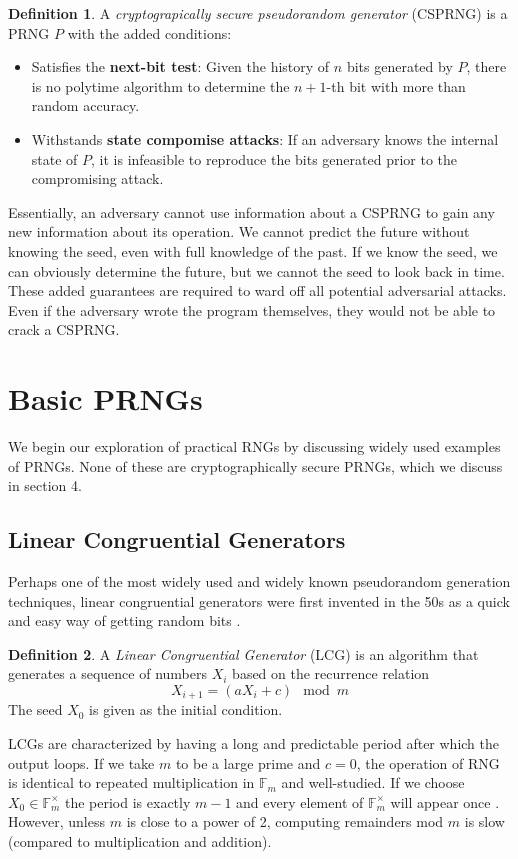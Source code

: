 \documentclass[titlepage]{article}
\theoremstyle{definition}
\newtheorem{definition}{Definition}[section]
\begin{document}
\begin{definition}\label{def:CSPRNG}
A \textit{cryptograpically secure pseudorandom generator} (CSPRNG) is a PRNG $P$ with the added conditions:
\begin{itemize}
\item Satisfies the \textbf{next-bit test}: Given the history of $n$ bits generated by $P$, there is no polytime algorithm to determine the $n+1$-th bit with more than random accuracy.
\item Withstands \textbf{state compomise attacks}: If an adversary knows the internal state of $P$, it is infeasible to reproduce the bits generated prior to the compromising attack. \cite{PractCrypt}
\end{itemize}
\end{definition}

Essentially, an adversary cannot use information about a CSPRNG to gain any new information about its operation. We cannot predict the future without knowing the seed, even with full knowledge of the past. If we know the seed, we can obviously determine the future, but we cannot  the seed to look back in time. These added guarantees are required to ward off all potential adversarial attacks. Even if the adversary wrote the program themselves, they would not be able to crack a CSPRNG.

\section{Basic PRNGs}
We begin our exploration of practical RNGs by discussing widely used examples of PRNGs. None of these are cryptographically secure PRNGs, which we discuss in section 4.

\subsection{Linear Congruential Generators}
Perhaps one of the most widely used and widely known pseudorandom generation techniques, linear congruential generators were first invented in the 50s as a quick and easy way of getting random bits \cite{LCG}.

\begin{definition}
A \textit{Linear Congruential Generator} (LCG) is an algorithm that generates a sequence of numbers $X_i$ based on the recurrence relation
$$X_{i+1} = (aX_i + c) \mod m$$
The seed $X_0$ is given as the initial condition.
\end{definition}
LCGs are characterized by having a long and predictable period after which the output loops. If we take $m$ to be a large prime and $c = 0$, the operation of RNG is identical to repeated multiplication in $\mathbb{F}_m$ and well-studied. If we choose $X_0 \in \mathbb{F}_m^\times$ the period is exactly $m-1$ and every element of $\mathbb{F}_m^\times$ will appear once \cite{Textbook}. However, unless $m$ is close to a power of 2, computing remainders mod $m$ is slow (compared to multiplication and addition).
\end{document}
